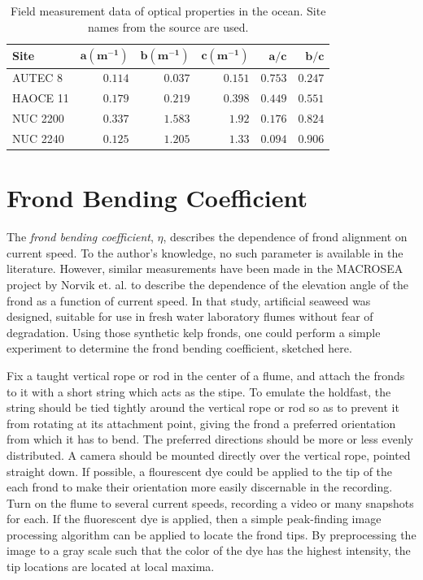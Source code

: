 \documentclass[ms,cpyr,lof,lot]{uathesis}
\begin{document}
\begin{table}
  \centering
  \caption{Field measurement data of optical properties in the ocean\cite{petzold_volume_1972}. Site names from the source are used.}
  \begin{tabular}{lrrrrr}
    \toprule
    \textbf{Site} & $\bm{a (\mbox{m}^{-1})}$ & $\bm{b (\mbox{m}^{-1})}$ & $\bm{c(\mbox{m}^{-1} )}$ & $\bm{a/c}$ & $\bm{b/c}$ \\
    \midrule
    AUTEC 8 & $0.114$ & $0.037$ & $0.151$ & $0.753$ & $0.247$ \\
    HAOCE 11 & $0.179$ & $0.219$ & $0.398$ & $0.449$ & $0.551$ \\
    NUC 2200 & $0.337$ & $1.583$ & $1.92$ & $0.176$ & $0.824$ \\
    NUC 2240 & $0.125$ & $1.205$ & $1.33$ & $0.094$ & $0.906$ \\
    \bottomrule
  \end{tabular}
  \label{tab:petzold}
\end{table}

\section{Frond Bending Coefficient}
The \textit{frond bending coefficient}, $\eta$, describes the dependence of frond alignment on current speed.
To the author's knowledge, no such parameter is available in the literature.
However, similar measurements have been made in the MACROSEA project by Norvik et. al.\cite{norvik_design_2017} to describe
the dependence of the elevation angle of the frond as a function of current speed.
In that study, artificial seaweed was designed, suitable for use in fresh water laboratory flumes without fear of degradation.
Using those synthetic kelp fronds, one could perform a simple experiment to determine the frond bending coefficient, sketched here.

Fix a taught vertical rope or rod in the center of a flume, and attach the fronds to it with a short string which acts as the stipe.
To emulate the holdfast, the string should be tied tightly around the vertical rope or rod so as to prevent it from rotating at its attachment point,
giving the frond a preferred orientation from which it has to bend.
The preferred directions should be more or less evenly distributed.
A camera should be mounted directly over the vertical rope, pointed straight down.
If possible, a flourescent dye could be applied to the tip of the each frond to make their orientation more easily discernable in the recording.
Turn on the flume to several current speeds, recording a video or many snapshots for each.
If the fluorescent dye is applied, then a simple peak-finding image processing algorithm can be applied to locate the frond tips.
By preprocessing the image to a gray scale such that the color of the dye has the highest intensity,
the tip locations are located at local maxima.
\end{document}
